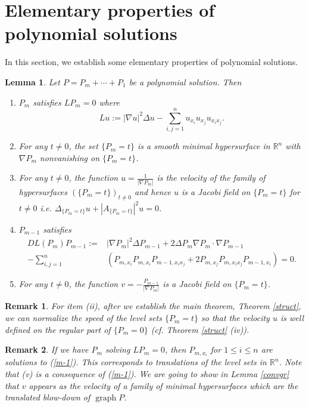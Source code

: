 \documentclass[pdflatex,sn-mathphys-num]{sn-jnl}%
\theoremstyle{thmstyleone}%
\newtheorem{lemma}[theorem]{Lemma}
\theoremstyle{thmstyletwo}%
\newtheorem{remark}{Remark}%
\theoremstyle{thmstylethree}%
\newcommand{\R}{\mathbb{R}}
\DeclareMathOperator{\graph}{graph}
\begin{document}
\section{Elementary properties of polynomial solutions}
\label{2}
In this section, we establish some elementary properties of polynomial solutions.
\begin{lemma}\label{expansion}
	Let $P=P_m+\cdots+P_1$ be a polynomial solution. Then 
	\begin{enumerate}
		
		\item[(i)] $P_m$ satisfies $LP_m=0$ where \[Lu:=|\nabla u|^2\Delta u-\sum_{i,j=1}^nu_{x_i}u_{x_j}u_{x_ix_j}.\]
		
		\item[(ii)] For any $t\neq 0$, the set $\{P_m=t\}$ is a smooth minimal hypersurface in $\R^n$ with $\nabla P_m$ nonvanishing on $\{P_m=t\}$.
		
		\item[(iii)] For any $t\neq 0$, the function $u=\frac{1}{|\nabla P_m|}$ is the velocity of the family of hypersurfaces $(\{P_m=t\})_{t\neq0}$ and hence $u$ is a Jacobi field on $\{P_m=t\}$ for $t\neq 0$ i.e. $\Delta_{\{P_m=t\}}u+|A_{\{P_m=t\}}|^2u=0$.
		
		\item[(iv)] $P_{m-1}$ satisfies 
		\begin{equation}
			\label{m-1}\begin{aligned}
				DL(P_m)P_{m-1}:=&|\nabla P_m|^2\Delta P_{m-1}+2\Delta P_m\nabla P_m\cdot \nabla P_{m-1}\\
				-\sum_{i,j=1}^n&\left( P_{m,x_i}P_{m,x_i}P_{m-1,x_ix_j}+2P_{m,x_j}P_{m,x_ix_j}P_{m-1,x_i}\right)=0.
			\end{aligned}
		\end{equation}
		\item[(v)] For any $t\neq 0$, the function $v=-\frac{P_{m-1}}{|\nabla P_m|}$ is a Jacobi field on $\{P_m=t\}$.
	\end{enumerate}
\end{lemma}
\begin{remark}
	For item (ii), after we establish the main theorem, Theorem \ref{struct}, we can normalize the speed of the level sets $\{P_m=t\}$ so that the velocity $u$ is well defined on the regular part of $\{P_m=0\}$ (cf. Theorem \ref{struct} (iv)).
\end{remark}
\begin{remark}\label{noinfo}
	If we have $P_m$ solving $LP_m=0$, then $P_{m,x_i}$ for $1\le i\le n$ are solutions to (\ref{m-1}). This corresponds to translations of the level sets in $\R^n$. Note that (v) is a consequence of (\ref{m-1}). We are going to show in Lemma \ref{convgr} that $v$ appears as the velocity of a family of minimal hypersurfaces which are the translated blow-down of $\graph P$.
\end{remark}
\end{document}
